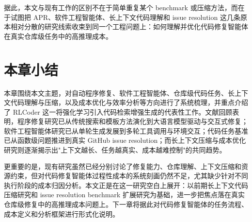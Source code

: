 据此，本文与现有工作的区别不在于简单重复某个 benchmark 或压缩方法，而在于试图把 APR、软件工程智能体、长上下文代码理解和 issue resolution 这几条原本相对分散的研究线索收束到同一个工程问题上：如何理解并优化代码修复智能体在真实仓库级任务中的高推理成本。

\section{本章小结}

本章围绕本文主题，对自动程序修复、软件工程智能体、仓库级代码任务、长上下文代码理解与压缩，以及成本优化与效率分析等方向进行了系统梳理，并重点介绍了 RLCoder 这一将强化学习引入代码检索增强生成的代表性工作。文献回顾表明，程序修复研究已从传统搜索和模板方法演化到大语言模型驱动与交互式修复；软件工程智能体研究已从单轮生成发展到多轮工具调用与环境交互；代码任务基准已从函数级问题推进到真实 GitHub issue resolution；而长上下文压缩与成本优化研究则逐渐揭示出"上下文越长、任务越真实、成本越难控制"的共同趋势。

更重要的是，现有研究虽然已经分别讨论了修复能力、仓库理解、上下文压缩和资源约束，但对代码修复智能体过程性成本的系统刻画仍然不足，尤其缺少针对不同执行阶段的成本归因分析。本文正是在这一研究空白上展开：以前期长上下文代码压缩研究和 issue resolution benchmark 扩展研究为基础，进一步把焦点落在真实仓库级修复中的高推理成本问题上。下一章将据此对代码修复智能体的任务流程、成本定义和分析框架进行形式化说明。
